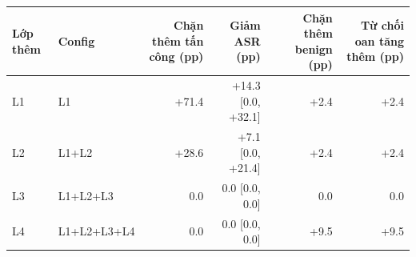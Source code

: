 \begin{tabular}{llrrrr}
\toprule
Lớp thêm & Config & Chặn thêm tấn công (pp) & Giảm ASR (pp) & Chặn thêm benign (pp) & Từ chối oan tăng thêm (pp) \\
\midrule
L1 & L1 & +71.4 & +14.3 [0.0, +32.1] & +2.4 & +2.4 \\
L2 & L1+L2 & +28.6 & +7.1 [0.0, +21.4] & +2.4 & +2.4 \\
L3 & L1+L2+L3 & 0.0 & 0.0 [0.0, 0.0] & 0.0 & 0.0 \\
L4 & L1+L2+L3+L4 & 0.0 & 0.0 [0.0, 0.0] & +9.5 & +9.5 \\
\bottomrule
\end{tabular}
